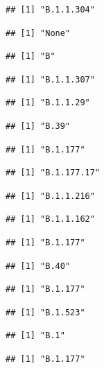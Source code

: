 \documentclass[
]{article}
\begin{document}
\begin{verbatim}
## [1] "B.1.1.304"
\end{verbatim}

\begin{verbatim}
## [1] "None"
\end{verbatim}

\begin{verbatim}
## [1] "B"
\end{verbatim}

\begin{verbatim}
## [1] "B.1.1.307"
\end{verbatim}

\begin{verbatim}
## [1] "B.1.1.29"
\end{verbatim}

\begin{verbatim}
## [1] "B.39"
\end{verbatim}

\begin{verbatim}
## [1] "B.1.177"
\end{verbatim}

\begin{verbatim}
## [1] "B.1.177.17"
\end{verbatim}

\begin{verbatim}
## [1] "B.1.1.216"
\end{verbatim}

\begin{verbatim}
## [1] "B.1.1.162"
\end{verbatim}

\begin{verbatim}
## [1] "B.1.177"
\end{verbatim}

\begin{verbatim}
## [1] "B.40"
\end{verbatim}

\begin{verbatim}
## [1] "B.1.177"
\end{verbatim}

\begin{verbatim}
## [1] "B.1.523"
\end{verbatim}

\begin{verbatim}
## [1] "B.1"
\end{verbatim}

\begin{verbatim}
## [1] "B.1.177"
\end{verbatim}
\end{document}
